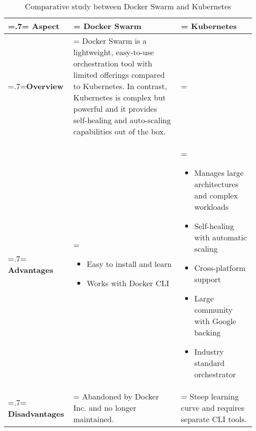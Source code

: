 \begin{table}[H]
    \renewcommand{\arraystretch}{1.5}%
    \caption{Comparative study between Docker Swarm and Kubernetes}
    \centering
    \medskip
    \begin{tabularx}{1\textwidth} {
            | >{\hsize=.7\hsize\linewidth=\hsize\centering\arraybackslash}X
            | >{\hsize=1.15\hsize\linewidth=\hsize\justifying\arraybackslash}X
            | >{\hsize=1.15\hsize\linewidth=\hsize\justifying\arraybackslash}X |}
        \hline
        \rowcolor{primary} \textbf {Aspect} & \textbf{Docker Swarm}                                                                                                                                                                                                                                                              & \textbf{Kubernetes}                                             \\
        \hline
        \textbf {Overview}                  & \multicolumn{2}{|>{\hsize=2.35\hsize}X|} {Docker Swarm is a lightweight, easy-to-use orchestration tool with limited offerings compared to Kubernetes. In contrast, Kubernetes is complex but powerful and it provides self-healing and auto-scaling capabilities out of the box.}                                                                   \\
        \hline
        \textbf {Advantages}                & \begin{itemize}[leftmargin=*, topsep=0pt, itemsep=1pt, parsep=2pt]
            \item Easy to install and learn
            \item Works with Docker CLI
        \end{itemize}                                                                                                                                                                                                                                                      & \begin{itemize}[leftmargin=*, topsep=0pt, itemsep=1pt, parsep=2pt]
            \item Manages large architectures and complex workloads
            \item Self-healing with automatic scaling
            \item Cross-platform support
            \item Large community with Google backing
            \item Industry standard orchestrator
        \end{itemize}                                   \\
        \hline
        \textbf {Disadvantages}             & \noindent Abandoned by Docker Inc. and no longer maintained.                                                                                                                                                                                                                       & \noindent Steep learning curve and requires separate CLI tools. \\
        \hline
    \end{tabularx}
\end{table}
